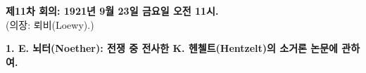 \documentclass[11pt]{article}
\begin{document}
\begin{center}
\textbf{제11차 회의: 1921년 9월 23일 금요일 오전 11시.}\\
(의장: 뢰비(Loewy).)
\end{center}

\begin{center}
\textbf{1. E. 뇌터(Noether): 전쟁 중 전사한 K. 헨첼트(Hentzelt)의 소거론 논문에 관하여.}
\end{center}
\end{document}
